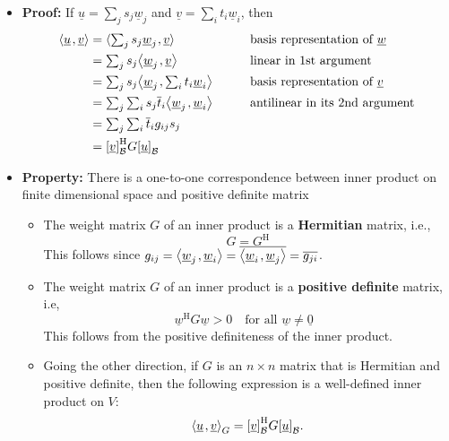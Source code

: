 \documentclass[11pt,twoside]{report}
\newcommand{\vecnot}{\underline}
\newcommand{\Herm}{{\mathrm{H}}}
\newcommand{\inner}[2]{{\left\langle #1 \mskip2mu , #2 \right\rangle}}
\newcommand{\tinner}[2]{{\langle #1 \mskip1mu , #2 \rangle}}
\begin{document}
\begin{itemize}
\item \textbf{Proof:} 
If $\vecnot{u} = \sum_{j} s_j \vecnot{w}_j$ and $\vecnot{v} = \sum_{i} t_i \vecnot{w}_i$, then \vspace{-1.5mm}
\begin{alignat*}{3} 
\inner{ \vecnot{u} }{ \vecnot{v} }
&= \tinner{ \textstyle\sum_{j} s_j \vecnot{w}_j }{ \vecnot{v} }  && \text{basis representation of $\vecnot{w}$}\\
& = \textstyle\sum_{j} s_j \inner{ \vecnot{w}_j }{ \vecnot{v} }  & \qquad & \text{linear in 1st argument}\\
&= \textstyle\sum_{j} s_j \inner{ \vecnot{w}_j }{ \textstyle\sum_{i} t_i \vecnot{w}_i } && \text{basis representation of $\vecnot{v}$} \\
& = \textstyle\sum_{j} \textstyle\sum_{i} s_j \overline{t}_i \inner{ \vecnot{w}_j }{ \vecnot{w}_i }  &&\text{antilinear in its 2nd argument} \\
&= \textstyle\sum_{j} \textstyle\sum_{i} \overline{t}_i g_{ij} s_j\\
& = \left[ \vecnot{v} \right]_{\mathcal{B}}^\Herm G \left[ \vecnot{u} \right]_{\mathcal{B}}
\end{alignat*}



\item \textbf{Property:} There is a one-to-one correspondence between inner product on finite dimensional space and positive definite matrix

\begin{itemize}
\item The weight matrix $G$ of an inner product is a  \textbf{Hermitian} matrix, i.e., 
\[G = G^\Herm
\]
This follows  since $g_{ij} = \inner{ \vecnot{w}_j }{ \vecnot{w}_i } = \overline{\inner{ \vecnot{w}_i }{ \vecnot{w}_j }} = \overline{g_{ji}}$. 


\item The weight matrix $G$ of an inner product is  a \textbf{positive definite} matrix, i.e, 
\[
 \vecnot{w}^\Herm G \vecnot{w} > 0 \quad \text{for all $\vecnot{w} \neq \vecnot{0}$ }
\]
This follows from the positive definiteness of the inner product. %




\item Going the other direction, if  $G$ is an $n \times n$ matrix that is Hermitian and positive definite, then the following expression is a well-defined inner product on $V$:
\begin{equation*}
\inner{ \vecnot{u} }{ \vecnot{v} }_G
= \left[ \vecnot{v} \right]_{\mathcal{B}}^\Herm G \left[ \vecnot{u} \right]_{\mathcal{B}}.
\end{equation*}


\end{itemize}
\end{itemize}
\end{document}
